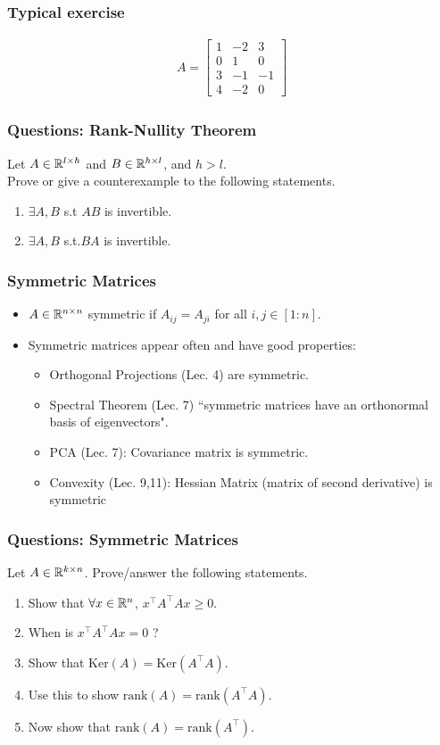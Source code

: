 \documentclass{beamer}
\begin{document}
\begin{frame}[t]
\frametitle{Typical exercise} 
\begin{align*}
A = 
\begin{bmatrix}
1 & -2 & 3 \\
0 & 1 & 0 \\
3 & -1 & -1 \\
4 & -2 & 0
\end{bmatrix}
\end{align*}
\pause
\pause
\end{frame}

\begin{frame}[t]
\frametitle{Questions: Rank-Nullity Theorem}
Let $A\in \mathbb{R}^{l\times h}$ and $B\in \mathbb{R}^{h\times l}$, and $h>l$.\\
Prove or give a counterexample to the following statements.
\begin{enumerate}
\item $\exists A,B$ s.t $AB$ is invertible.
\item $\exists A,B$ s.t.$BA$ is invertible.
\end{enumerate}
\pause
\pause
\pause
\end{frame}

\begin{frame}[t]
\frametitle{Symmetric Matrices}
\begin{itemize}
\item $A \in \mathbb{R}^{n\times n}$ symmetric if $A_{ij} = A_{ji}$ for all $i,j \in [1:n]$.
\item Symmetric matrices appear often and have good properties:
\begin{itemize}
\item Orthogonal Projections (Lec. 4) are symmetric.\\
\item Spectral Theorem (Lec. 7) ``symmetric matrices have an orthonormal basis of eigenvectors".\\
\item PCA (Lec. 7): Covariance matrix is symmetric.
\item Convexity (Lec. 9,11): Hessian Matrix (matrix of second derivative) is symmetric
\end{itemize}
\end{itemize}
\end{frame}

\begin{frame}[t]
\frametitle{Questions: Symmetric Matrices}
Let $A\in \mathbb{R}^{k \times n}$. Prove/answer the following statements.
\begin{enumerate}
\item Show that $\forall x\in\mathbb{R}^n$, $ x^\top A^\top Ax\geq0$.
\item When is $x^\top A^\top Ax = 0$ ?
\item Show that $\text{Ker}(A) = \text{Ker}(A^\top A)$.
\item Use this to show $\text{rank}(A)=\text{rank}(A^\top A)$.
\item Now show that $\text{rank}(A)=\text{rank}(A^\top)$.
\end{enumerate}
\pause
\pause
\pause
\pause
\end{frame}
\end{document}
